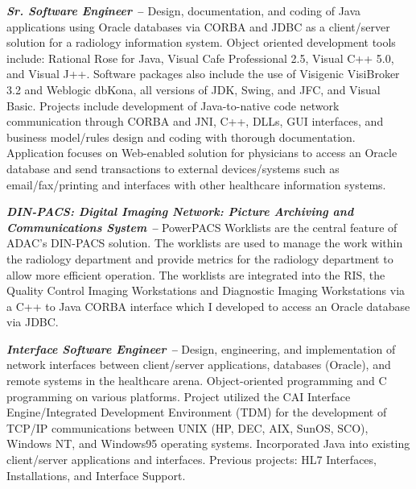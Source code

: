 \documentclass[10pt]{report}
\begin{document}
  \begin{description}

    \item{\bf{\emph{Sr. Software Engineer -- }}} Design, documentation, and
    coding of Java applications using Oracle databases via CORBA and JDBC as a
    client/server solution for a radiology information system. Object oriented
    development tools include: Rational Rose for Java, Visual Cafe Professional
    2.5, Visual C++ 5.0, and Visual J++.  Software packages also include the use
    of Visigenic VisiBroker 3.2 and Weblogic dbKona, all versions of JDK, Swing,
    and JFC, and Visual Basic.  Projects include development of Java-to-native
    code network communication through CORBA and JNI, C++, DLLs, GUI interfaces,
    and business model/rules design and coding with thorough documentation.
    Application focuses on Web-enabled solution for physicians to access an
    Oracle database and send transactions to external devices/systems such as
    email/fax/printing and interfaces with other healthcare information systems.

    \item{\bf{\emph{DIN-PACS: Digital Imaging Network: Picture Archiving and
    Communications System --}}} PowerPACS Worklists are the central feature of
    ADAC's DIN-PACS solution. The worklists are used to manage the work within
    the radiology department and provide metrics for the radiology department to
    allow more efficient operation.  The worklists are integrated into the RIS,
    the Quality Control Imaging Workstations and Diagnostic Imaging Workstations
    via a C++ to Java CORBA interface which I developed to access an Oracle
    database via JDBC.

    \item{\bf{\emph{Interface Software Engineer --}}} Design, engineering, and
    implementation of network interfaces between client/server applications,
    databases (Oracle), and remote systems in the healthcare arena.
    Object-oriented programming and C programming on various platforms.  Project
    utilized the CAI Interface Engine/Integrated Development Environment (TDM)
    for the development of TCP/IP communications between UNIX (HP, DEC, AIX,
    SunOS, SCO), Windows NT, and Windows95 operating systems.  Incorporated Java
    into existing client/server applications and interfaces.  Previous projects:
    HL7 Interfaces, Installations, and Interface Support.

  \end{description}
\end{document}
